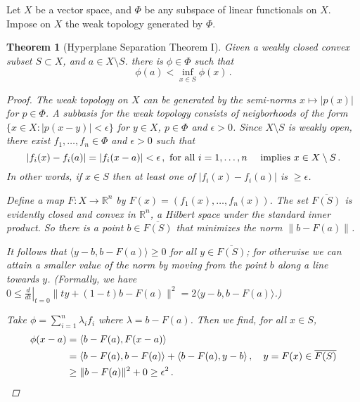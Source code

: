 \documentclass[12pt]{article}
\newtheorem{thm}{Theorem}
\newcommand{\real}{\mathbb{R}}
\providecommand{\abs}[1]{\lvert#1\rvert}
\providecommand{\norm}[1]{\lVert#1\rVert}
\providecommand{\ip}[2]{\langle {#1}, {#2} \rangle}
\begin{document}
Let $X$ be a vector space, and $\Phi$ be any subspace
of linear functionals on $X$.
Impose on $X$ the weak topology generated by $\Phi$.

\begin{thm}[Hyperplane Separation Theorem I]
Given a weakly closed convex subset $S \subset X$,
and $a \in X \setminus S$.
there is $\phi \in \Phi$ such that
\[
\phi(a) < \inf_{x \in S} \phi(x)\,.
\]
\begin{proof}
The weak topology on $X$ can be generated by the semi-norms
$x \mapsto \abs{ p(x) }$ for $p \in \Phi$.
A subbasis for the weak topology
consists of neigborhoods of the form
$\{ x \in X \colon \abs{p(x-y)} < \epsilon \}$
for $y \in X$, $p \in \Phi$ and $\epsilon > 0$.
Since $X \setminus S$ is weakly open,
there exist $f_1, \dotsc, f_n \in \Phi$  and $\epsilon > 0$
such that
\[
\abs{f_i(x) - f_i(a)} = \abs{f_i(x-a)} < \epsilon \,, \text{ for all $i=1, \dotsc, n$ \quad implies }
x \in X \setminus S\,.
\]
In other words, if $x \in S$ then at least one of 
$\abs{f_i(x) - f_i(a)}$ is $\geq \epsilon$.

Define a map $F\colon X \to \real^n$
by $F(x) = ( f_1(x), \dotsc, f_n(x) )$.
The set $\overline{F(S)}$ is evidently
closed and convex in $\real^n$, a Hilbert space
under the standard inner product.
So there is a point $b \in \overline{F(S)}$
that minimizes the norm $\norm{b - F(a)}$.

It follows that $\ip{y-b}{b-F(a)} \geq 0$ for all $y \in \overline{F(S)}$;
for otherwise we can attain a smaller value of the norm
by moving from the point $b$ along a line towards $y$.
(Formally, we have
$0 \leq \left.\frac{d}{dt}\right|_{t=0} \norm{ty + (1-t)b - F(a)}^2 = 2\ip{y-b}{b-F(a)}$.)

Take $\phi = \sum_{i=1}^n \lambda_i f_i$
where $\lambda = b-F(a)$.
Then we find, for all $x \in S$,
\begin{align*}
\phi(x-a) &= \ip{b - F(a)}{F(x-a)} \\
&= \ip{b-F(a)}{b-F(a)} + \ip{b-F(a)}{y-b}\,, \quad y = F(x)  \in \overline{F(S)}\\
&\geq \norm{b-F(a)}^2 + 0 \geq \epsilon^2\,. \qedhere
\end{align*}
\end{proof}
\end{thm}
\end{document}
